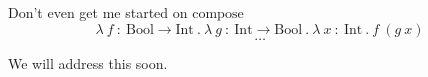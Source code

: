\begin{frame}
  Don't even get me started on $\text{compose}$
  \[
    \lambda~f~{:}~\text{Bool}\rightarrow\text{Int}~.~\lambda~g~{:}~\text{Int}\rightarrow\text{Bool}~.~\lambda~x~{:}~\text{Int}~.~f~\left(g~x \right) \]
  \[\ldots\]
\end{frame}

\begin{frame}
  We will address this soon.
\end{frame}
